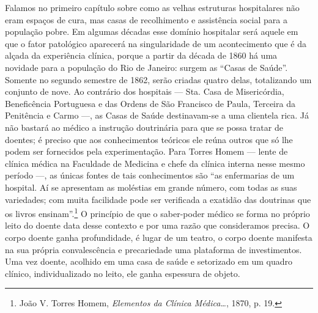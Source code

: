 Falamos no primeiro capítulo sobre como as velhas estruturas
hospitalares não eram espaços de cura, mas casas de recolhimento e
assistência social para a população pobre. Em algumas décadas esse
domínio hospitalar será aquele em que o fator patológico aparecerá na
singularidade de um acontecimento que é da alçada da experiência
clínica, porque a partir da década de 1860 há uma novidade para a
população do Rio de Janeiro: surgem as ``Casas de Saúde''. Somente no
segundo semestre de 1862, serão criadas quatro delas, totalizando um
conjunto de nove. Ao contrário dos hospitais --- Sta. Casa de
Misericórdia, Beneficência Portuguesa e das Ordens de São Francisco de
Paula, Terceira da Penitência e Carmo ---, as Casas de Saúde
destinavam-se a uma clientela rica. Já não bastará ao médico a instrução
doutrinária para que se possa tratar de doentes; é preciso que aos
conhecimentos teóricos ele reúna outros que só lhe podem ser fornecidos
pela experimentação. Para Torres Homem --- lente de clínica médica na
Faculdade de Medicina e chefe da clínica interna nesse mesmo período ---,
as únicas fontes de tais conhecimentos são ``as enfermarias de um
hospital. Aí se apresentam as moléstias em grande número, com todas as
suas variedades; com muita facilidade pode ser verificada a exatidão das
doutrinas que os livros ensinam''.\footnote{João V. Torres Homem,
  \textit{Elementos da Clínica Médica\ldots{}}, 1870, p. 19.} O princípio
de que o saber-poder médico se forma no próprio leito do doente data
desse contexto e por uma razão que consideramos precisa. O corpo doente
ganha profundidade, é lugar de um teatro, o corpo doente manifesta na
sua própria convalescência e precariedade uma plataforma de
investimentos. Uma vez doente, acolhido em uma casa de saúde e
setorizado em um quadro clínico, individualizado no leito, ele ganha
espessura de objeto.

